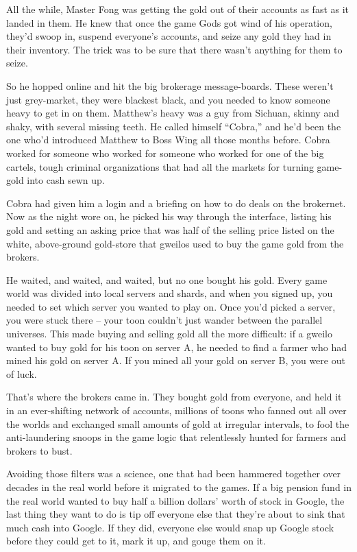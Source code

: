 All the while, Master Fong was getting the gold out of their
accounts as fast as it landed in them. He knew that once the game
Gods got wind of his operation, they'd swoop in, suspend everyone's
accounts, and seize any gold they had in their inventory. The trick
was to be sure that there wasn't anything for them to seize.

So he hopped online and hit the big brokerage message-boards. These
weren't just grey-market, they were blackest black, and you needed
to know someone heavy to get in on them. Matthew's heavy was a guy
from Sichuan, skinny and shaky, with several missing teeth. He
called himself ``Cobra,'' and he'd been the one who'd introduced
Matthew to Boss Wing all those months before. Cobra worked for
someone who worked for someone who worked for one of the big
cartels, tough criminal organizations that had all the markets for
turning game-gold into cash sewn up.

Cobra had given him a login and a briefing on how to do deals on
the brokernet. Now as the night wore on, he picked his way through
the interface, listing his gold and setting an asking price that
was half of the selling price listed on the white, above-ground
gold-store that gweilos used to buy the game gold from the
brokers.

He waited, and waited, and waited, but no one bought his gold.
Every game world was divided into local servers and shards, and
when you signed up, you needed to set which server you wanted to
play on. Once you'd picked a server, you were stuck there -- your
toon couldn't just wander between the parallel universes. This made
buying and selling gold all the more difficult: if a gweilo wanted
to buy gold for his toon on server A, he needed to find a farmer
who had mined his gold on server A. If you mined all your gold on
server B, you were out of luck.

That's where the brokers came in. They bought gold from everyone,
and held it in an ever-shifting network of accounts, millions of
toons who fanned out all over the worlds and exchanged small
amounts of gold at irregular intervals, to fool the anti-laundering
snoops in the game logic that relentlessly hunted for farmers and
brokers to bust.

Avoiding those filters was a science, one that had been hammered
together over decades in the real world before it migrated to the
games. If a big pension fund in the real world wanted to buy half a
billion dollars' worth of stock in Google, the last thing they want
to do is tip off everyone else that they're about to sink that much
cash into Google. If they did, everyone else would snap up Google
stock before they could get to it, mark it up, and gouge them on
it.

